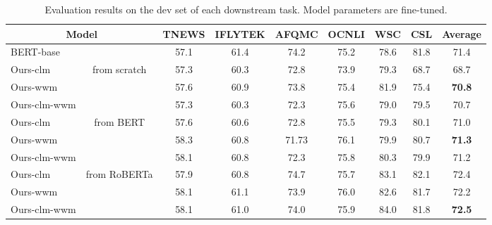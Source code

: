 \documentclass[11pt]{article}
\begin{document}
\begin{table*}[ht]
  \centering
    \begin{tabular}{l|c|cc|cc|cc|c}
    \toprule
    \multicolumn{2}{c|}{Model} & TNEWS & IFLYTEK & AFQMC & OCNLI & WSC   & CSL   & Average \\
    \midrule
    BERT-base &       & 57.1  & 61.4  & 74.2  & 75.2 & 78.6  & 81.8  & 71.4 \\
    \midrule
    Ours-clm & \multirow{3}[2]{*}{from scratch} & 57.3  & 60.3  & 72.8  & 73.9  & 79.3  & 68.7  & 68.7 \\
    Ours-wwm &       & 57.6  & 60.9  & 73.8  & 75.4  & 81.9  & 75.4  & \textbf{70.8} \\
    Ours-clm-wwm &       & 57.3 & 60.3  & 72.3  & 75.6  & 79.0    & 79.5  & 70.7 \\
    \midrule
    Ours-clm & \multirow{3}[2]{*}{from BERT} & 57.6  & 60.6  & 72.8  & 75.5  & 79.3  & 80.1  & 71.0 \\
    Ours-wwm &       & 58.3  & 60.8  & 71.73 & 76.1  & 79.9  & 80.7  & \textbf{71.3} \\
    Ours-clm-wwm &       & 58.1  & 60.8  & 72.3  & 75.8  & 80.3  & 79.9  & 71.2 \\
    \midrule
    Ours-clm & \multirow{3}[2]{*}{from RoBERTa} & 57.9 & 60.8  & 74.7  & 75.7  & 83.1  & 82.1  & 72.4 \\
    Ours-wwm &       & 58.1  & 61.1  & 73.9  & 76.0  & 82.6  & 81.7  & 72.2 \\
    Ours-clm-wwm &       & 58.1  & 61.0    & 74.0    & 75.9  & 84.0   & 81.8  & \textbf{72.5} \\
    \bottomrule
    \end{tabular}%
  \caption{Evaluation results on the dev set of each downstream task. Model parameters are fine-tuned.}
  \label{tab:main}%
\end{table*}%
\end{document}
